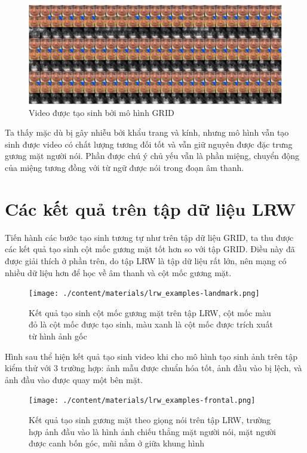 \begin{figure}[H]
    \centering
    \includegraphics[width=16cm]{./content/materials/khang_gen.png}
    \caption{Video được tạo sinh bởi mô hình GRID}
\end{figure}

Ta thấy mặc dù bị gây nhiễu bởi khẩu trang và kính, nhưng mô hình vẫn tạo sinh được video có chất lượng tương đối tốt và vẫn giữ nguyên được đặc trưng gương mặt người nói. Phần được chú ý chủ yếu vẫn là phần miệng, chuyển động của miệng tương đồng với từ ngữ được nói trong đoạn âm thanh.

\section{Các kết quả trên tập dữ liệu LRW}
Tiến hành các bước tạo sinh tương tự như trên tập dữ liệu GRID, ta thu được các kết quả tạo sinh cột mốc gương mặt tốt hơn so với tập GRID. Điều này đã được giải thích ở phần trên, do tập LRW là tập dữ liệu rất lớn, nên mạng có nhiều dữ liệu hơn để học về âm thanh và cột mốc gương mặt.

\begin{figure}[H]
    \centering
    \texttt{[image: ./content/materials/lrw\_examples-landmark.png]}
    \caption{Kết quả tạo sinh cột mốc gương mặt trên tập LRW, cột mốc màu đỏ là cột mốc được tạo sinh, màu xanh là cột mốc được trích xuất từ hình ảnh gốc}
\end{figure}

Hình sau thể hiện kết quả tạo sinh video khi cho mô hình tạo sinh ảnh trên tập kiểm thử với 3 trường hợp: ảnh mẫu được chuẩn hóa tốt, ảnh đầu vào bị lệch, và ảnh đầu vào được quay một bên mặt.

\begin{figure}[H]
    \centering
    \texttt{[image: ./content/materials/lrw\_examples-frontal.png]}
    \caption{Kết quả tạo sinh gương mặt theo giọng nói trên tập LRW, trường hợp ảnh đầu vào là hình ảnh chiếu thẳng mặt người nói, mặt người được canh bốn góc, mũi nằm ở giữa khung hình}
\end{figure}

